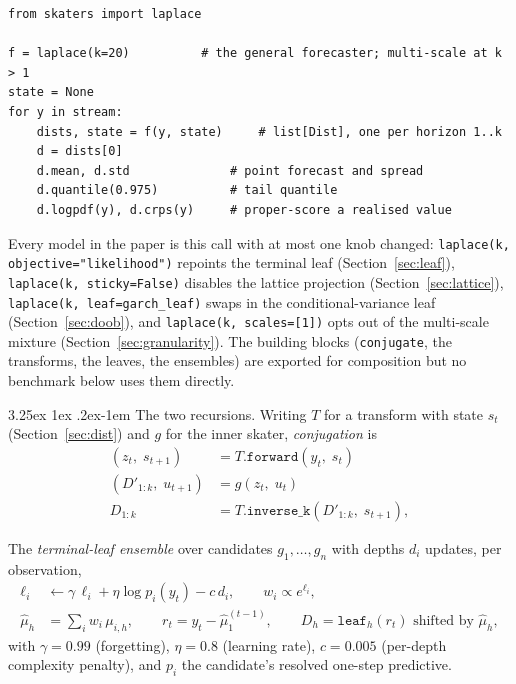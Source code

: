 \documentclass[article]{jss}
\makeatletter
\renewcommand\paragraph{\@startsection{paragraph}{4}{\z@}%
  {3.25ex \@plus1ex \@minus.2ex}{-1em}%
  {\normalfont\normalsize\itshape}}
\providecommand{\code}[1]{\texttt{#1}}
\makeatother
\begin{document}
\begin{verbatim}
from skaters import laplace

f = laplace(k=20)          # the general forecaster; multi-scale at k > 1
state = None
for y in stream:
    dists, state = f(y, state)     # list[Dist], one per horizon 1..k
    d = dists[0]
    d.mean, d.std              # point forecast and spread
    d.quantile(0.975)          # tail quantile
    d.logpdf(y), d.crps(y)     # proper-score a realised value
\end{verbatim}

\noindent Every model in the paper is this call with at most one knob changed:
\code{laplace(k, objective="likelihood")} repoints the terminal leaf
(Section~\ref{sec:leaf}), \code{laplace(k, sticky=False)} disables the lattice
projection (Section~\ref{sec:lattice}), \code{laplace(k, leaf=garch\_leaf)}
swaps in the conditional-variance leaf (Section~\ref{sec:doob}), and
\code{laplace(k, scales=[1])} opts out of the multi-scale mixture
(Section~\ref{sec:granularity}). The building blocks (\code{conjugate}, the
transforms, the leaves, the ensembles) are exported for composition but no
benchmark below uses them directly.

\paragraph{The two recursions.}
Writing $T$ for a transform with state $s_t$ (Section~\ref{sec:dist}) and $g$
for the inner skater, \emph{conjugation} is
\begin{align*}
(z_t,\; s_{t+1}) &= T.\code{forward}(y_t,\; s_t) \\
(D'_{1:k},\; u_{t+1}) &= g(z_t,\; u_t) \\
D_{1:k} &= T.\code{inverse\_k}(D'_{1:k},\; s_{t+1}),
\end{align*}

The \emph{terminal-leaf ensemble} over candidates $g_1,\dots,g_n$ with
depths $d_i$ updates, per observation,
\begin{align*}
\ell_i &\leftarrow \gamma\,\ell_i + \eta \log p_i(y_t) - c\,d_i,
  \qquad w_i \propto e^{\ell_i}, \\
\hat\mu_h &= \textstyle\sum_i w_i\, \mu_{i,h}, \qquad
r_t = y_t - \hat\mu_{1}^{(t-1)}, \qquad
D_h = \code{leaf}_h(r_t) \text{ shifted by } \hat\mu_h,
\end{align*}
with $\gamma = 0.99$ (forgetting), $\eta = 0.8$ (learning rate), $c = 0.005$
(per-depth complexity penalty), and $p_i$ the candidate's resolved one-step
predictive.
\end{document}
